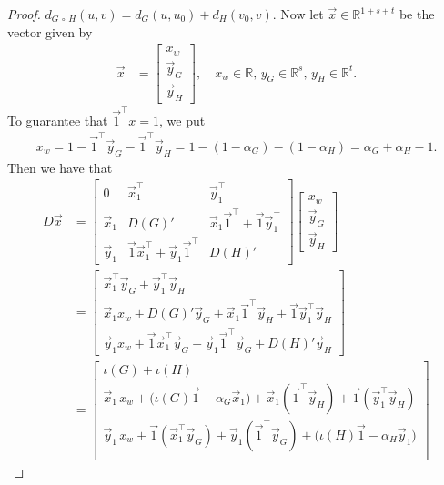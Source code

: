 \documentclass[10pt,a4paper]{amsart}
\newcommand{\Circ}{\circ}
\newcommand{\distmatrix}{D}
\newcommand{\one}{\vec{1}}
\newcommand{\x}{\vec{x}}
\newcommand{\y}{\vec{y}}
\begin{document}
\begin{proof}
        $d_{G\,\Circ\,H}(u, v)=d_G(u,u_{0})+d_H(v_{0},v)$. Now let $\x\in\mathbb{R}^{1+s+t}$ be the vector given by
            \begin{align}\label{eq:xw}
                \x &= \begin{bmatrix}
                    x_w\\ \y_G \\ \y_H
                \end{bmatrix}, \quad x_w\in\mathbb{R},\, y_G\in\mathbb{R}^{s},\,y_H\in\mathbb{R}^{t}.
            \end{align}
        To guarantee that $\one^\top x = 1$, we put
            \begin{align*}
                x_w = 1-\one^\top \y_G - \one^\top \y_H = 1 - (1-\alpha_G) - (1-\alpha_H) = \alpha_G + \alpha_H - 1.
            \end{align*}
        Then we have that
            \begin{align*}
                \distmatrix \x &= \begin{bmatrix}
                    0 & \x_{1}^\top & \y_{1}^\top\\
                    \x_{1} & {\distmatrix(G)}' & \x_{1}\one^\top + \one \y_{1}^\top\\
                    \y_{1} & \one \x_{1}^\top + \y_{1}\one^\top & {\distmatrix(H)}'
                \end{bmatrix}\begin{bmatrix}
                    x_w\\ \y_G \\ \y_H
                \end{bmatrix}\\
                &= \begin{bmatrix}
                    \x_{1}^\top \y_G + \y_{1}^\top \y_H\\
                    \x_{1} x_w + {\distmatrix(G)}' \y_G + \x_1\one^\top\y_H + \one \y_{1}^\top \y_H\\
                    \y_{1} x_w + \one \x_{1}^\top \y_G + \y_1\one^\top \y_G + {\distmatrix(H)}' \y_H
                \end{bmatrix}\\
                &= \begin{bmatrix}
                    \iota(G) + \iota(H)\\
                    \x_1\,x_w + \bigl(\iota(G)\one - \alpha_G\x_1\bigr) + \x_1(\one^\top\y_H) + \one(\y_1^\top\y_H)\\
                    \y_1\,x_w + \one(\x_1^\top\y_G) + \y_1(\one^\top\y_G) + \bigl(\iota(H)\one - \alpha_H\y_1\bigr)\\

\end{bmatrix}
\end{align*}
\end{proof}
\end{document}
